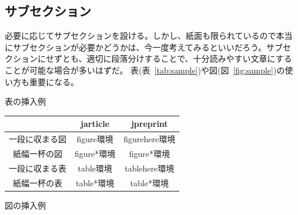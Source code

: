 \documentclass{jabstract}
\begin{document}
\begin{multicols}{2}
\subsection{サブセクション}
必要に応じてサブセクションを設ける。しかし、紙面も限られているので本当
にサブセクションが必要かどうかは、今一度考えてみるといいだろう。サブセ
クションにせずとも、適切に段落分けすることで、十分読みやすい文章にする
ことが可能な場合が多いはずだ。
表(表~\ref{tab:sample})や図(図~\ref{fig:sample})の使い方も重要になる。

\begin{tablehere}
  \noindent
  \parbox{\linewidth}{
    \centering
    \caption{表の挿入例}\label{tab:sample}
    \begin{tabular}{|c|c|c|}
      \hline
      & jarticle & jpreprint\\
      \hline
      一段に収まる図 & figure環境 & figurehere環境\\
      \hline
      紙幅一杯の図 & figure*環境 & figure*環境\\
      \hline
      一段に収まる表 & table環境 & tablehere環境\\
      \hline
      紙幅一杯の表 & table*環境 & table*環境\\
      \hline
    \end{tabular}
  }%
\end{tablehere}

\begin{figurehere}
  \noindent
  \parbox{\linewidth}{
    \centering
    \caption{図の挿入例}\label{fig:sample}
  }%
\end{figurehere}


\end{multicols}
\end{document}

